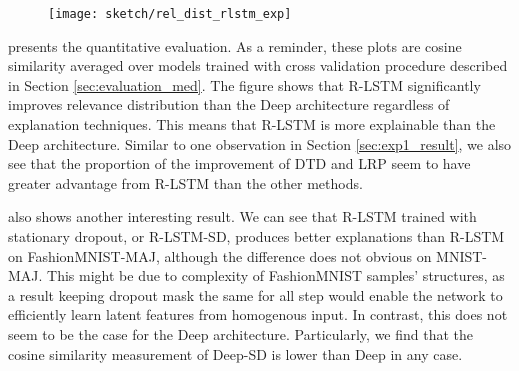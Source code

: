  \begin{figure}[!htb]
\centering
\texttt{[image: sketch/rel\_dist\_rlstm\_exp]}

\label{fig:rel_dist_rlstm_exp}
\end{figure}

\addfigure{\ref{fig:rel_dist_rlstm_exp}} presents the quantitative evaluation. As a reminder, these plots are cosine similarity averaged over models trained with cross validation procedure described in  Section \ref{sec:evaluation_med}. The figure shows that R-LSTM significantly improves relevance distribution than the Deep architecture regardless of explanation techniques.  This means that R-LSTM is more explainable than the Deep architecture. Similar to one observation in Section \ref{sec:exp1_result}, we also see that the proportion of the improvement of DTD and LRP seem to have greater advantage from R-LSTM than the other methods.  

\addfigure{\ref{fig:rel_dist_rlstm_exp}}  also shows another interesting result. We can see that R-LSTM trained with stationary dropout, or R-LSTM-SD, produces better explanations than R-LSTM on FashionMNIST-MAJ, although the difference does not obvious on MNIST-MAJ. This might be due to complexity of FashionMNIST samples' structures, as a result keeping dropout mask the same for all step would enable the network to efficiently learn latent features from homogenous input. In contrast, this does not seem to be the case for the Deep architecture. Particularly, we find that the cosine similarity measurement of Deep-SD is lower than Deep in any case.

\clearpage

